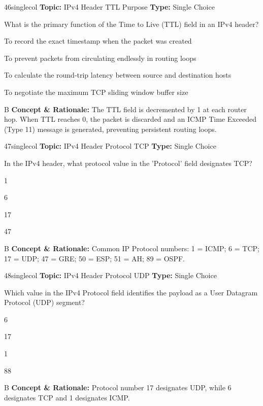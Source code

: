 \begin{qcard}{46}{singlecol}
\textcolor{darkslate!75}{\small\textbf{Topic:} IPv4 Header TTL Purpose \hfill \textbf{Type:} Single Choice}\vspace{0.4em}\par
What is the primary function of the Time to Live (TTL) field in an IPv4 header?
\begin{qoptions}
\item To record the exact timestamp when the packet was created
\item To prevent packets from circulating endlessly in routing loops
\item To calculate the round-trip latency between source and destination hosts
\item To negotiate the maximum TCP sliding window buffer size
\end{qoptions}
\end{qcard}
\nopagebreak
\begin{explainbox}{B}
\textbf{Concept \& Rationale:} The TTL field is decremented by 1 at each router hop. When TTL reaches 0, the packet is discarded and an ICMP Time Exceeded (Type 11) message is generated, preventing persistent routing loops.
\end{explainbox}

\begin{qcard}{47}{singlecol}
\textcolor{darkslate!75}{\small\textbf{Topic:} IPv4 Header Protocol TCP \hfill \textbf{Type:} Single Choice}\vspace{0.4em}\par
In the IPv4 header, what protocol value in the 'Protocol' field designates TCP?
\begin{qoptions}
\item 1
\item 6
\item 17
\item 47
\end{qoptions}
\end{qcard}
\nopagebreak
\begin{explainbox}{B}
\textbf{Concept \& Rationale:} Common IP Protocol numbers: 1 = ICMP; 6 = TCP; 17 = UDP; 47 = GRE; 50 = ESP; 51 = AH; 89 = OSPF.
\end{explainbox}

\begin{qcard}{48}{singlecol}
\textcolor{darkslate!75}{\small\textbf{Topic:} IPv4 Header Protocol UDP \hfill \textbf{Type:} Single Choice}\vspace{0.4em}\par
Which value in the IPv4 Protocol field identifies the payload as a User Datagram Protocol (UDP) segment?
\begin{qoptions}
\item 6
\item 17
\item 1
\item 88
\end{qoptions}
\end{qcard}
\nopagebreak
\begin{explainbox}{B}
\textbf{Concept \& Rationale:} Protocol number 17 designates UDP, while 6 designates TCP and 1 designates ICMP.
\end{explainbox}

